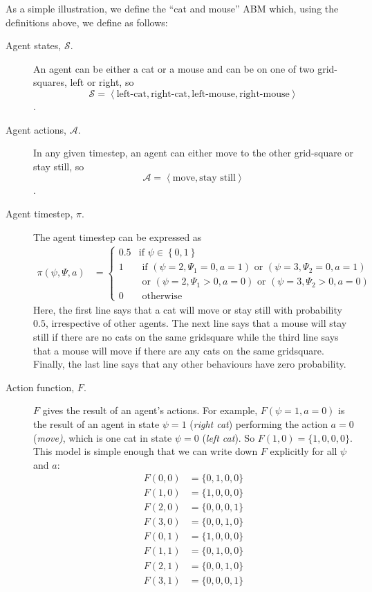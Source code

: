 \documentclass{article}
\begin{document}
As a simple illustration, we define the ``cat and mouse'' ABM which, using the definitions above, we define as follows: 
\begin{description}
	\item[Agent states, $\mathcal{S}$.] An agent can be either a cat or a mouse and can be on one of two grid-squares, left or right, so \[\mathcal{S} = \left<\textrm{left-cat}, \textrm{right-cat}, \textrm{left-mouse}, \textrm{right-mouse} \right>\]. 

	\item[Agent actions, $\mathcal{A}$.] In any given timestep, an agent can either move to the other grid-square or stay still, so \[\mathcal{A} = \left<\textrm{move}, \textrm{stay still}\right>\].
	

	\item[Agent timestep, $\pi$.] The agent timestep can be expressed as
	\[
	\begin{aligned}
	\pi(\psi, \Psi, a) &=
	\begin{cases}
	0.5 & \text{if } \psi \in \left\{0, 1\right\}\\  %
	1 & \text{ if }(\psi = 2, \Psi_1 = 0, a=1) \text{ or } (\psi=3, \Psi_2 = 0, a=1)\\
	& \text{ or } (\psi = 2, \Psi_1 > 0, a=0) \text{ or } (\psi=3, \Psi_2 > 0, a=0)\\
	0 & \text{ otherwise}
	\end{cases}
	\end{aligned}
	\]
	 Here, the first line says that a cat will move or stay still with probability $0.5$, irrespective of other agents. The next line says that a mouse will stay still if there are no cats on the same gridsquare while the third line says that a mouse will move if there are any cats on the same gridsquare. Finally, the last line says that any other behaviours have zero probability.

\item[Action function, $F$.] $F$ gives the result of an agent's actions. For example, $F(\psi=1, a=0)$ is the result of an agent in state $\psi=1$ (\textit{right cat}) performing the action $a=0$ (\textit{move)}, which is one cat in state $\psi=0$ (\textit{left cat}). So $F(1,0) = \{1,0,0,0\}$. This model is simple enough that we can write down $F$ explicitly for all $\psi$ and $a$:
\[
\begin{aligned}
F(0, 0) &= \{0,1,0,0\}\\
F(1, 0) &= \{1,0,0,0\}\\
F(2, 0) &= \{0,0,0,1\}\\
F(3, 0) &= \{0,0,1,0\}\\
F(0, 1) &= \{1,0,0,0\}\\
F(1, 1) &= \{0,1,0,0\}\\
F(2, 1) &= \{0,0,1,0\}\\
F(3, 1) &= \{0,0,0,1\}\\
\end{aligned}
\]
\end{description}
\end{document}
